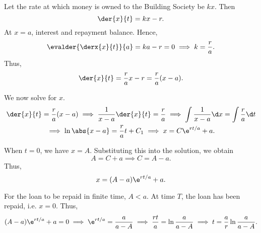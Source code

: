 \begin{solution}
    Let the rate at which money is owned to the Building Society be $kx$. Then \[\der{x}{t} = kx - r.\] At $x = a$, interest and repayment balance. Hence, \[\evalder{\derx{x}{t}}{a} = ka - r = 0 \implies k = \frac{r}{a}.\] Thus, \[\der{x}{t} = \frac{r}{a} x - r = \frac{r}{a} (x - a).\]

    We now solve for $x$.
    \begin{gather*}
        \der{x}{t} = \frac{r}{a} (x - a) \implies\frac{1}{x-a} \der{x}{t} = \frac{r}{a} \implies\int \frac{1}{x-a} \d x = \int \frac{r}{a} \d t\\
        \implies \ln \abs{x-a} = \frac{r}{a} t + C_1 \implies x = C\e^{rt/a} + a.
    \end{gather*}

    When $t = 0$, we have $x = A$. Substituting this into the solution, we obtain \[A = C + a \implies C = A - a.\] Thus, \[x = (A-a)\e^{rt/a} + a.\]

    \begin{center}
    \end{center}

    For the loan to be repaid in finite time, $A < a$. At time $T$, the loan has been repaid, i.e. $x = 0$. Thus, \[(A-a) \e^{rt/a} + a = 0 \implies \e^{rt/a} = \frac{a}{a-A} \implies \frac{rt}{a} = \ln{\frac{a}{a-A}} \implies t = \frac{a}{r} \ln{\frac{a}{a-A}}.\]
\end{solution}